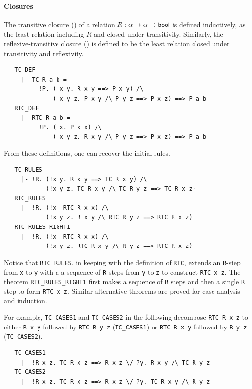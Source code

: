 {\paragraph {Closures}

The transitive closure () of a relation $R : \alpha
\to\alpha\to\mbox{\small{\textbf{\sf{bool}}}}$ is defined inductively, as the least
relation including $R$ and closed under transitivity. Similarly, the
reflexive-transitive closure () is defined to be the least
relation closed under transitivity and reflexivity.
%
\begin{hol}
\begin{verbatim}
   TC_DEF
     |- TC R a b =
          !P. (!x y. R x y ==> P x y) /\
              (!x y z. P x y /\ P y z ==> P x z) ==> P a b
   RTC_DEF
     |- RTC R a b =
          !P. (!x. P x x) /\
              (!x y z. R x y /\ P y z ==> P x z) ==> P a b
\end{verbatim}
\end{hol}

\noindent
From these definitions, one can recover the initial rules.
%
\begin{hol}
\begin{verbatim}
   TC_RULES
     |- !R. (!x y. R x y ==> TC R x y) /\
            (!x y z. TC R x y /\ TC R y z ==> TC R x z)
   RTC_RULES
     |- !R. (!x. RTC R x x) /\
            (!x y z. R x y /\ RTC R y z ==> RTC R x z)
   RTC_RULES_RIGHT1
     |- !R. (!x. RTC R x x) /\
            (!x y z. RTC R x y /\ R y z ==> RTC R x z)
\end{verbatim}
\end{hol}
%
Notice that {\small\verb+RTC_RULES+}, in keeping with the definition
of {\small\verb+RTC+}, extends an \verb+R+-step from \verb+x+ to
\verb+y+ with a a sequence of \verb+R+-steps from \verb+y+ to \verb+z+
to construct \verb+RTC x z+. The theorem
{\small\verb+RTC_RULES_RIGHT1+} first makes a sequence of \verb+R+
steps and then a single \verb+R+ step to form \verb+RTC x z+. Similar
alternative theorems are proved for case analysis and induction.

For example, {\small\verb+TC_CASES1+} and {\small\verb+TC_CASES2+} in the
following decompose {\small\verb+RTC R x z+} to either
{\small\verb+R x y+} followed by {\small\verb+RTC R y z+}
({\small\verb+TC_CASES1+})
or
{\small\verb+RTC R x y+} followed by {\small\verb+R y z+}
({\small\verb+TC_CASES2+}).

%
\begin{hol}
\begin{verbatim}
   TC_CASES1
     |- !R x z. TC R x z ==> R x z \/ ?y. R x y /\ TC R y z
   TC_CASES2
     |- !R x z. TC R x z ==> R x z \/ ?y. TC R x y /\ R y z


\end{verbatim}
\end{hol}}
